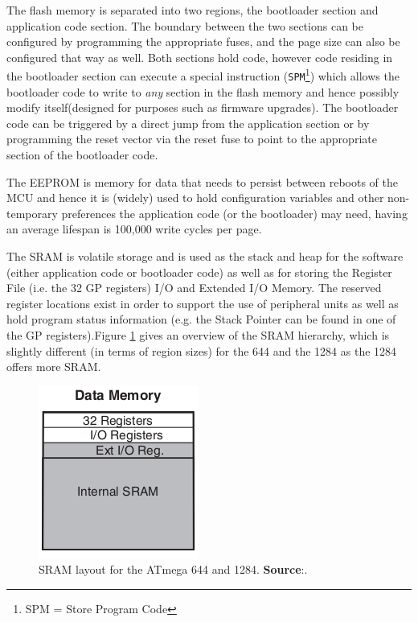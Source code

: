 \documentclass[10pt,a4paper,twocolumn]{article}
\begin{document}
	The flash memory is separated into two regions, the bootloader section and application code section. The boundary between the two sections can be configured by programming the appropriate fuses, and the page size can also be configured that way as well. Both sections hold code, however code residing in the bootloader section can execute a special instruction (\texttt{SPM}\footnote{SPM = Store Program Code}) which allows the bootloader code to write to \textit{any} section in the flash memory and hence possibly modify itself(designed for purposes such as firmware upgrades). The bootloader code can be triggered by a direct jump from the application section or by programming the reset vector via the reset fuse to point to the appropriate section of the bootloader code. 
	
	The EEPROM is memory for data that needs to persist between reboots of the MCU and hence it is (widely) used to hold configuration variables and other non-temporary preferences the application code (or the bootloader) may need, having an average lifespan is 100,000 write cycles per page. 
	
	The SRAM is volatile storage and is used as the stack and heap for the software (either application code or bootloader code) as well as for storing the Register File (i.e. the 32 GP registers) I/O and Extended I/O Memory. The reserved register locations exist in order to support the use of peripheral units as well as hold program status information (e.g. the Stack Pointer can be found in one of the GP registers).Figure \ref{fig:stack} gives an overview of the SRAM hierarchy, which is slightly different (in terms of region sizes) for the 644 and the 1284 as the 1284 offers more SRAM.
	
	\begin{figure}
		\includegraphics[scale=0.7]{img/stack.png}
		\caption{SRAM layout for the ATmega 644 and 1284. \textbf{Source}:\protect\citep{atmega_manual}.}
		\label{fig:stack}		
	\end{figure}
	
\end{document}
